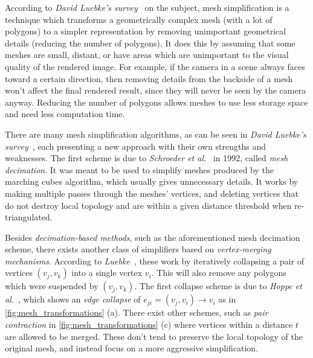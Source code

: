 According to \emph{David Luebke's survey}~\cite{luebke2001developer} on the subject, mesh simplification is a technique which transforms a geometrically complex mesh (with a lot of polygons) to a simpler representation by removing unimportant geometrical details (reducing the number of polygons). It does this by assuming that some meshes are small, distant, or have areas which are unimportant to the visual quality of the rendered image. For example, if the camera in a scene always faces toward a certain direction, then removing details from the backside of a mesh won't affect the final rendered result, since they will never be seen by the camera anyway. Reducing the number of polygons allows meshes to use less storage space and need less computation time.

There are many mesh simplification algorithms, as can be seen in \emph{David Luebke's survey}~\cite{luebke2001developer}, each presenting a new approach with their own strengths and weaknesses. The first scheme is due to \emph{Schroeder et al.}~\cite{schroeder1992decimation} in 1992, called \emph{mesh decimation}. It was meant to be used to simplify meshes produced by the marching cubes algorithm, which usually gives unnecessary details. It works by making multiple passes through the meshes' vertices, and deleting vertices that do not destroy local topology and are within a given distance threshold when re-triangulated.

Besides \emph{decimation-based methods}, such as the aforementioned mesh decimation scheme, there exists another class of simplifiers based on \emph{vertex-merging mechanisms}. According to \emph{Luebke}~\cite{luebke2001developer}, these work by iteratively collapsing a pair of vertices \((v_j, v_k)\) into a single vertex \(v_i\). This will also remove any polygons which were suspended by \((v_j, v_k)\). The first collapse scheme is due to \emph{Hoppe et al.}~\cite{hoppe1993mesh}, which shows an \emph{edge collapse} of \(e_{ji} = (v_j, v_i) \rightarrow v_i\) as in \cref{fig:mesh_transformations} (a). There exist other schemes, such as \emph{pair contraction} in \cref{fig:mesh_transformations} (c) where vertices within a distance $t$ are allowed to be merged. These don't tend to preserve the local topology of the original mesh, and instead focus on a more aggressive simplification.


